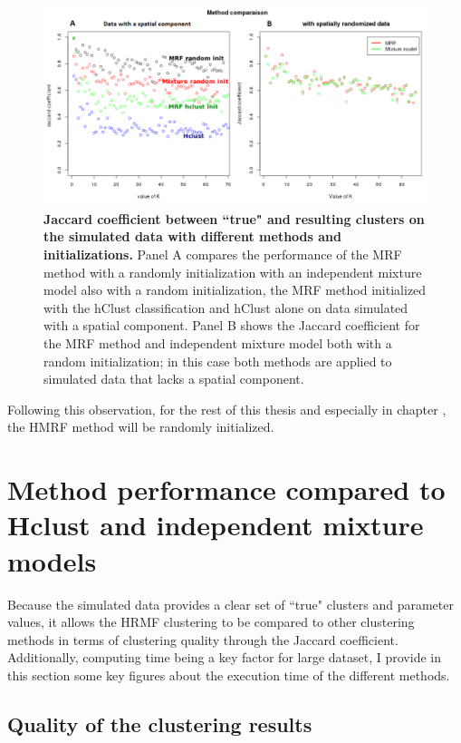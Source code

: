	\begin{figure}[h]
\centerline{\includegraphics[width=0.9\linewidth]{gfx/chapter5/method_comparison.png}}
\caption{{\bf Jaccard coefficient between ``true" and resulting clusters on the simulated data with different methods and initializations.} Panel A compares the performance of the MRF method with a randomly initialization with an independent mixture model also with a random initialization, the MRF method initialized with the hClust classification and hClust alone on data simulated with a spatial component. Panel B shows the Jaccard coefficient for the MRF method and independent mixture model both with a random initialization; in this case both methods are applied to simulated data that lacks a spatial component.}
\label{fig:methodComparison}
	\end{figure}

Following this observation, for the rest of this thesis and especially in chapter , the HMRF method will be randomly initialized.

\section{Method performance compared to Hclust and independent mixture models}
 Because the simulated data provides a clear set of ``true" clusters and parameter values, it allows the HRMF clustering to be compared to other clustering methods in terms of clustering quality through the Jaccard coefficient. Additionally, computing time being a key factor for large dataset, I provide in this section some key figures about the execution time of the different methods.
	\subsection{Quality of the clustering results}
	
